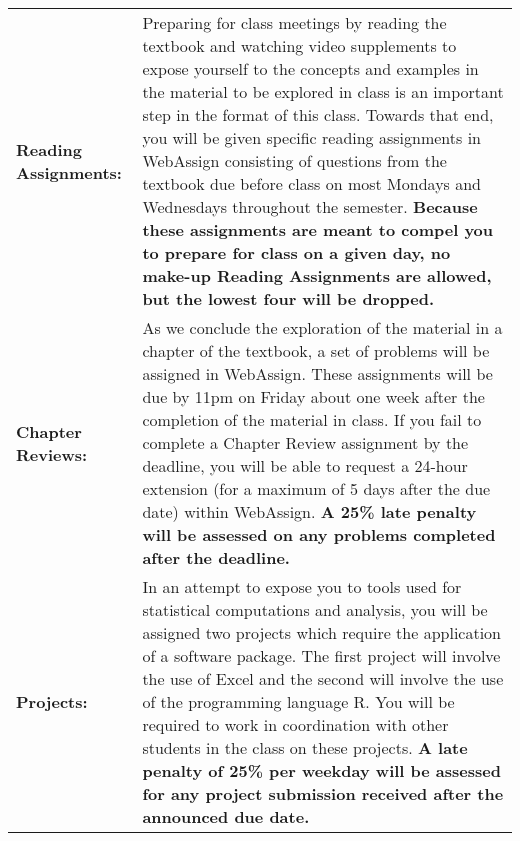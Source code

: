\documentclass[11pt]{article}
\begin{document}
\begin{longtable}{lp{5.2in}}
\textbf{\parbox[t][1.0in][t]{1.0in}{Reading Assignments:}}
     & Preparing for class meetings by reading the textbook and watching video supplements to expose yourself to the concepts and examples in the material to be explored in class is an important step in the format of this class.  Towards that end, you will be given specific reading assignments in WebAssign consisting of questions from the textbook due before class on most Mondays and Wednesdays throughout the semester.  {\bf Because these assignments are meant to compel you to prepare for class on a given day, no make-up Reading Assignments are allowed, but the lowest four will be dropped.}
       \\[8pt]

\textbf{\parbox[t][1.0in][t]{1.0in}{Chapter Reviews:}}
     & As we conclude the exploration of the material in a chapter of the textbook, a set of problems will be assigned in WebAssign.  These assignments will be due by 11pm on Friday about one week after the completion of the material in class.  If you fail to complete a Chapter Review assignment by the deadline, you will be able to request a 24-hour extension (for a maximum of 5 days after the due date) within WebAssign.  {\bf A 25\% late penalty will be assessed on any problems completed after the deadline.}
       \\[8pt]

\textbf{Projects:}       
       & In an attempt to expose you to tools used for statistical computations and analysis, you will be assigned two projects which require the application of a software package.  The first project will involve the use of Excel and the second will involve the use of the programming language R.  You will be required to work in coordination with other students in the class on these projects.  {\bf A late penalty of 25\% per weekday will be assessed for any project submission received after the announced due date.}
       \\[8pt]


\end{longtable}
\end{document}
